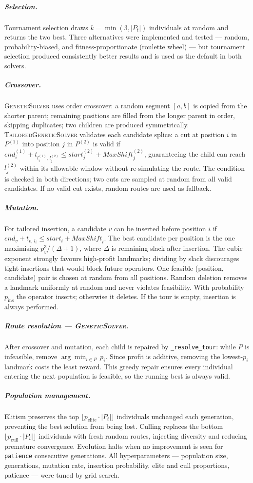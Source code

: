 \subparagraph{Selection.}
Tournament selection draws $k = \min(3,|P_t|)$ individuals at random and returns the two best. Three alternatives were implemented and tested --- random, probability-biased, and fitness-proportionate (roulette wheel) --- but tournament selection produced consistently better results and is used as the default in both solvers.

\subparagraph{Crossover.}
\textsc{GeneticSolver} uses order crossover: a random segment $[a,b]$ is copied from the shorter parent; remaining positions are filled from the longer parent in order, skipping duplicates; two children are produced symmetrically. \textsc{TailoredGeneticSolver} validates each candidate splice: a cut at position $i$ in $P^{(1)}$ into position $j$ in $P^{(2)}$ is valid if $\mathit{end}_i^{(1)} + t_{l_i^{(1)},\,l_j^{(2)}} \le \mathit{start}_j^{(2)} + \mathit{MaxShift}_j^{(2)}$, guaranteeing the child can reach $l_j^{(2)}$ within its allowable window without re-simulating the route. The condition is checked in both directions; two cuts are sampled at random from all valid candidates. If no valid cut exists, random routes are used as fallback.

\subparagraph{Mutation.}
For tailored insertion, a candidate $v$ can be inserted before position $i$ if $\mathit{end}_v + t_{v,\,l_i} \le \mathit{start}_i + \mathit{MaxShift}_i$. The best candidate per position is the one maximising $p_v^3/(\Delta + 1)$, where $\Delta$ is remaining slack after insertion. The cubic exponent strongly favours high-profit landmarks; dividing by slack discourages tight insertions that would block future operators. One feasible (position, candidate) pair is chosen at random from all positions. Random deletion removes a landmark uniformly at random and never violates feasibility. With probability $p_{\mathrm{ins}}$ the operator inserts; otherwise it deletes. If the tour is empty, insertion is always performed.

\subparagraph{Route resolution --- \textsc{GeneticSolver}.}
After crossover and mutation, each child is repaired by \texttt{\_resolve\_tour}: while $P$ is infeasible, remove $\arg\min_{i\in P}\,p_i$. Since profit is additive, removing the lowest-$p_i$ landmark costs the least reward. This greedy repair ensures every individual entering the next population is feasible, so the running best is always valid.

\subparagraph{Population management.}
Elitism preserves the top $\lfloor p_{\mathrm{elite}}\cdot|P_t|\rfloor$ individuals unchanged each generation, preventing the best solution from being lost. Culling replaces the bottom $\lfloor p_{\mathrm{cull}}\cdot|P_t|\rfloor$ individuals with fresh random routes, injecting diversity and reducing premature convergence. Evolution halts when no improvement is seen for \texttt{patience} consecutive generations. All hyperparameters --- population size, generations, mutation rate, insertion probability, elite and cull proportions, patience --- were tuned by grid search.

